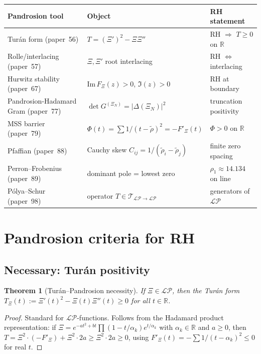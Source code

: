 \documentclass[11pt,a4paper]{article}
\newtheorem{theorem}{Theorem}[section]
\begin{document}
\begin{center}
\renewcommand{\arraystretch}{1.2}
\begin{tabular}{p{4cm}p{4.5cm}p{5cm}}
\toprule
\textbf{Pandrosion tool} & \textbf{Object} & \textbf{RH statement} \\
\midrule
Tur\'an form (paper~56) & $T = (\Xi')^2 - \Xi \Xi''$ & RH $\Rightarrow$ $T \ge 0$ on $\mathbb{R}$ \\
Rolle/interlacing (paper~57) & $\Xi, \Xi'$ root interlacing & RH $\Leftrightarrow$ interlacing \\
Hurwitz stability (paper~67) & $\mathrm{Im}\, F_\Xi(z) > 0$, $\Im(z) > 0$ & RH at boundary \\
Pandrosion-Hadamard Gram (paper~77) & $\det G^{(\Xi_N)} = |\Delta(\Xi_N)|^2$ & truncation positivity \\
MSS barrier (paper~79) & $\Phi(t) = \sum 1/(t - \tilde\rho)^2 = -F'_\Xi(t)$ & $\Phi > 0$ on $\mathbb{R}$ \\
Pfaffian (paper~88) & Cauchy skew $C_{ij} = 1/(\tilde\rho_i - \tilde\rho_j)$ & finite zero spacing \\
Perron--Frobenius (paper~89) & dominant pole = lowest zero & $\rho_1 \approx 14.134$ on line \\
P\'olya--Schur (paper~98) & operator $T \in \mathcal{T}_{\mathcal{LP}\to\mathcal{LP}}$ & generators of $\mathcal{LP}$ \\
\bottomrule
\end{tabular}
\end{center}

\section{Pandrosion criteria for RH}\label{sec:criteria}

\subsection{Necessary: Tur\'an positivity}

\begin{theorem}[Tur\'an--Pandrosion necessity]\label{thm:turan-necessary}
If $\Xi \in \mathcal{LP}$, then the Tur\'an form
$T_\Xi(t) := \Xi'(t)^2 - \Xi(t)\Xi''(t) \ge 0$ for all $t \in \mathbb{R}$.
\end{theorem}

\begin{proof}
Standard for $\mathcal{LP}$-functions. Follows from the Hadamard product
representation: if $\Xi = e^{-at^2 + bt}\prod (1 - t/\alpha_k) e^{t/\alpha_k}$
with $\alpha_k \in \mathbb{R}$ and $a \ge 0$, then
$T = \Xi^2 \cdot (-F'_\Xi) + \Xi^2 \cdot 2a \ge \Xi^2 \cdot 2a \ge 0$, using
$F'_\Xi(t) = -\sum 1/(t - \alpha_k)^2 \le 0$ for real $t$.
\end{proof}
\end{document}
